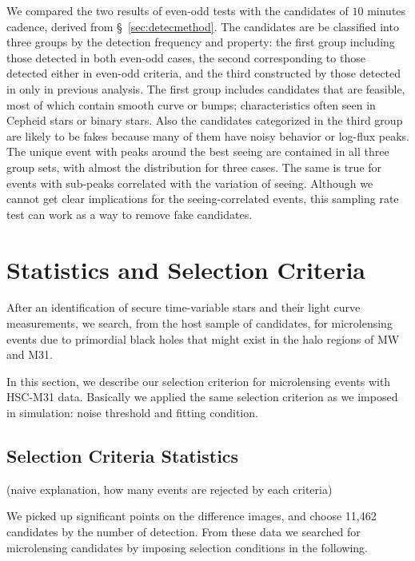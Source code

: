\documentclass[iop, apj]{emulateapj}
\newcommand{\?}{\stackrel{?}{=}}
\begin{document}
\begin{itemize}
We compared the two results of even-odd tests with the candidates of $10$ minutes cadence, derived from \S~\ref{sec:detecmethod}. The candidates are be classified into three groups by the detection frequency and property: the first group including those detected in both even-odd cases, the second corresponding to those detected either in even-odd criteria, and the third constructed by those detected in only in previous analysis. The first group includes candidates that are feasible, most of which contain smooth curve or bumps; characteristics often seen in Cepheid stars or binary stars. 
Also the candidates categorized in the third group are likely to be fakes because many of them have noisy behavior or log-flux peaks. The unique event with peaks around the best seeing are contained in all three group sets, with almost the distribution for three cases. The same is true for events with sub-peaks correlated with the variation of seeing. Although we cannot get clear implications for the seeing-correlated events, this sampling rate test can work as a way to remove fake candidates. 
%
\end{itemize}



\section{Statistics and Selection Criteria}%
\label{sec:res2}
After an identification of secure time-variable stars and their light curve measurements, 
we search, from the host sample of candidates, for microlensing events due to primordial black holes that might exist in the halo regions of MW and M31. 


In this section, we describe our selection criterion for microlensing events with HSC-M31 data. 
Basically we applied the same selection criterion as we imposed in simulation: 
noise threshold and fitting condition. 


\subsection{Selection Criteria Statistics}
(naive explanation, how many events are rejected by each criteria)

We picked up significant points on the difference images, 
and choose 11,462 candidates by the number of detection. 
From these data we searched for microlensing candidates by imposing selection conditions in the following. 
\end{document}

